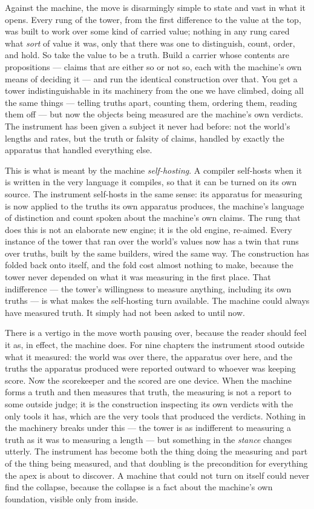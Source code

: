 Against the machine, the move is disarmingly simple to state and vast in what it opens. Every rung of the tower,
from the first difference to the value at the top, was built to work over some kind of carried value; nothing in
any rung cared what \emph{sort} of value it was, only that there was one to distinguish, count, order, and hold.
So take the value to be a truth. Build a carrier whose contents are propositions --- claims that are either so or
not so, each with the machine's own means of deciding it --- and run the identical construction over that. You get
a tower indistinguishable in its machinery from the one we have climbed, doing all the same things --- telling
truths apart, counting them, ordering them, reading them off --- but now the objects being measured are the
machine's own verdicts. The instrument has been given a subject it never had before: not the world's lengths and
rates, but the truth or falsity of claims, handled by exactly the apparatus that handled everything else.

This is what is meant by the machine \emph{self-hosting}. A compiler self-hosts when it is written in the very
language it compiles, so that it can be turned on its own source. The instrument self-hosts in the same sense: its
apparatus for measuring is now applied to the truths its own apparatus produces, the machine's language of
distinction and count spoken about the machine's own claims. The rung that does this is not an elaborate new
engine; it is the old engine, re-aimed. Every instance of the tower that ran over the world's values now has a
twin that runs over truths, built by the same builders, wired the same way. The construction has folded back onto
itself, and the fold cost almost nothing to make, because the tower never depended on what it was measuring in the
first place. That indifference --- the tower's willingness to measure anything, including its own truths --- is
what makes the self-hosting turn available. The machine could always have measured truth. It simply had not been
asked to until now.

There is a vertigo in the move worth pausing over, because the reader should feel it as, in effect, the machine
does. For nine chapters the instrument stood outside what it measured: the world was over there, the apparatus
over here, and the truths the apparatus produced were reported outward to whoever was keeping score. Now the
scorekeeper and the scored are one device. When the machine forms a truth and then measures that truth, the
measuring is not a report to some outside judge; it is the construction inspecting its own verdicts with the only
tools it has, which are the very tools that produced the verdicts. Nothing in the machinery breaks under this ---
the tower is as indifferent to measuring a truth as it was to measuring a length --- but something in the
\emph{stance} changes utterly. The instrument has become both the thing doing the measuring and part of the thing
being measured, and that doubling is the precondition for everything the apex is about to discover. A machine that
could not turn on itself could never find the collapse, because the collapse is a fact about the machine's own
foundation, visible only from inside.

